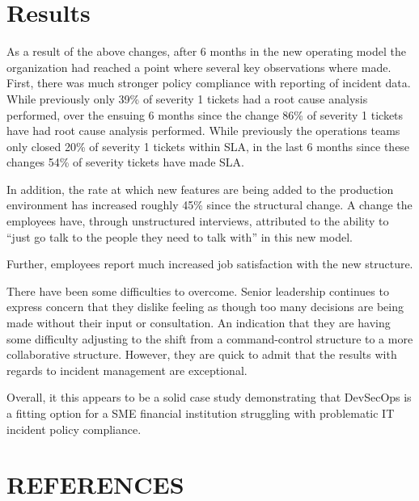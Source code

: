 \documentclass[doc]{apa7}
\begin{document}
\section{Results}
\label{sec:orgf049c22}

As a result of the above changes, after 6 months in the new operating model the organization had reached a point where several key observations where made. First, there was much stronger policy compliance with reporting of incident data. While previously only 39\% of severity 1 tickets had a root cause analysis performed, over the ensuing 6 months since the change 86\% of severity 1 tickets have had root cause analysis performed. While previously the operations teams only closed 20\% of severity 1 tickets within SLA, in the last 6 months since these changes 54\% of severity tickets have made SLA.

In addition, the rate at which new features are being added to the production environment has increased roughly 45\% since the structural change. A change the employees have, through unstructured interviews, attributed to the ability to ``just go talk to the people they need to talk with'' in this new model.

Further, employees report much increased job satisfaction with the new structure.

There have been some difficulties to overcome. Senior leadership continues to express concern that they dislike feeling as though too many decisions are being made without their input or consultation. An indication that they are having some difficulty adjusting to the shift from a command-control structure to a more collaborative structure. However, they are quick to admit that the results with regards to incident management are exceptional.

Overall, it this appears to be a solid case study demonstrating that DevSecOps is a fitting option for a SME financial institution struggling with problematic IT incident policy compliance.



\newpage
\section*{REFERENCES}
\label{sec:org47bf538}
\printbibliography[heading=none]
\end{document}
